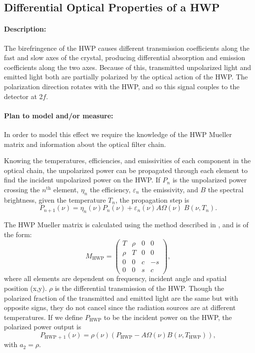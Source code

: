 
\subsection{Differential Optical Properties of a HWP}
\label{HWP Differential Optical Properties}

\paragraph{Description:}
The birefringence of the HWP causes different transmission coefficients along the fast and slow axes of the crystal,
producing differential absorption and emission coefficients along the two axes.
Because of this, transmitted unpolarized light and emitted light both are partially polarized by the optical action of the HWP.
The polarization direction rotates with the HWP, and so this signal couples to the detector at 2$f$.

\paragraph{Plan to model and/or measure:}
In order to model this effect we require the knowledge of the HWP Mueller matrix and information about the optical filter chain.

Knowing the temperatures, efficiencies, and emissivities of each component in the optical chain,
the unpolarized power can be propagated through each element to find the incident unpolarized power on the HWP.
If $P_n$ is the unpolarized power crossing the $n^\text{th}$ element, $\eta_n$ the efficiency, $\varepsilon_n$ the emissivity, and $B$ the spectral brightness, given the temperature $T_n$,
the propagation step is 
\begin{equation}
\label{unpolarized_propagation}
P_{n+1}(\nu) = \eta_n(\nu) P_n(\nu) + \varepsilon_n(\nu) A\Omega(\nu)\;  B(\nu, T_n) .
\end{equation}


The HWP Mueller matrix is calculated using the method described in \cite{Salatino16}, and is of the form:
\[
M_\text{HWP} = \left(
\begin{array}{cccc}
T & \rho & 0 & 0\\
\rho & T & 0 & 0\\
0 & 0 & c & -s \\
0 & 0 & s & c
\end{array}
\right),
\]
where all elements are dependent on frequency, incident angle and spatial position (x,y).
$\rho$ is the differential transmission of the HWP.
Though the polarized fraction of the transmitted and emitted light are the same but with opposite signs,
they do not cancel since the radiation sources are at different temperatures.
If we define $P_\text{HWP}$ to be the incident power on the HWP, the polarized power output is 
\begin{equation}
\label{eq:polarized_output}
P_\text{HWP + 1}(\nu) = \rho(\nu)(P_\text{HWP} - A\Omega(\nu)B(\nu, T_\text{HWP})),
\end{equation}
with $a_2 = \rho$. 

